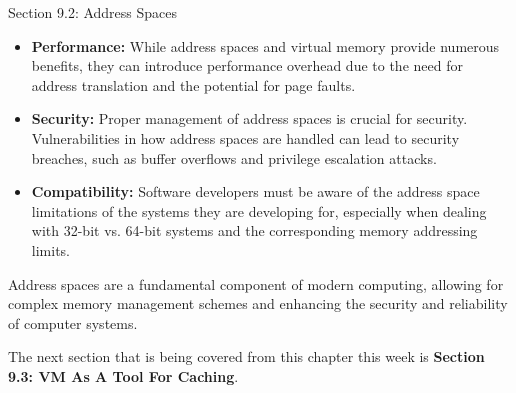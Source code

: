 \begin{notes}{Section 9.2: Address Spaces}
    \begin{itemize}
        \item \textbf{Performance:} While address spaces and virtual memory provide numerous benefits, they can introduce performance overhead due to the need for address translation and the 
        potential for page faults.
        \item \textbf{Security:} Proper management of address spaces is crucial for security. Vulnerabilities in how address spaces are handled can lead to security breaches, such as buffer overflows 
        and privilege escalation attacks.
        \item \textbf{Compatibility:} Software developers must be aware of the address space limitations of the systems they are developing for, especially when dealing with 32-bit vs. 64-bit systems 
        and the corresponding memory addressing limits.
    \end{itemize}
    
    Address spaces are a fundamental component of modern computing, allowing for complex memory management schemes and enhancing the security and reliability of computer systems.    
\end{notes}

The next section that is being covered from this chapter this week is \textbf{Section 9.3: VM As A Tool For Caching}.

